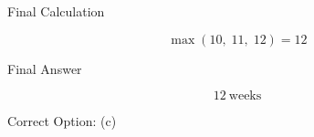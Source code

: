 \documentclass{beamer}
\begin{document}
\begin{frame}{Final Calculation}

\[
\max(10,\;11,\;12) = 12
\]

\end{frame}

\begin{frame}{Final Answer}

\[
\boxed{12\ \text{weeks}}
\]

Correct Option: (c)

\end{frame}

\end{document}
